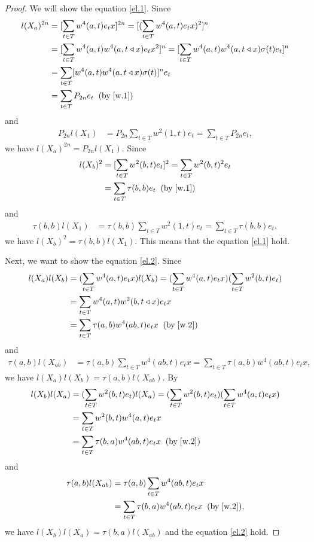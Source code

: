 \documentclass[a4paper,11pt]{amsart}
\numberwithin{equation}{section}
\begin{document}
\begin{proof}
We will show the equation \eqref{el.1}. Since
\begin{align*}
l(X_a)^{2n}&=[\sum\limits_{t \in T}w^4(a,t)e_t x]^{2n}=[(\sum\limits_{t \in T}w^4(a,t)e_t x)^2]^{n}\\
&=[\sum\limits_{t \in T}w^4(a,t)w^4(a,t\triangleleft x)e_t x^2]^{n}=[\sum\limits_{t \in T}w^4(a,t)w^4(a,t\triangleleft x)\sigma(t)e_t]^{n}\\
&=\sum\limits_{t \in T}[w^4(a,t)w^4(a,t\triangleleft x)\sigma(t)]^n e_t\\
&=\sum\limits_{t \in T} P_{2n}e_t\;\;(\text{by}\;\eqref{w.1})
\end{align*}
and
\begin{align*}
P_{2n}l(X_1)&=P_{2n}\sum\limits_{t \in T}w^2(1,t)e_t=\sum\limits_{t \in T}P_{2n}e_t,
\end{align*}
we have $l(X_a)^{2n}=P_{2n}l(X_1)$. Since
\begin{align*}
l(X_b)^{2}&=[\sum\limits_{t \in T}w^2(b,t)e_t]^{2}=\sum\limits_{t \in T}w^2(b,t)^2e_t\\
&=\sum\limits_{t \in T}\tau(b,b)e_t \;\;(\text{by}\;\eqref{w.1})
\end{align*}
and
\begin{align*}
\tau(b,b)l(X_1)&=\tau(b,b)\sum\limits_{t \in T}w^2(1,t)e_t=\sum\limits_{t \in T}\tau(b,b)e_t,
\end{align*}
 we have $l(X_b)^{2}=\tau(b,b)l(X_1)$. This means that the equation \eqref{el.1} hold.

Next, we want to show the equation \eqref{el.2}. Since
\begin{align*}
l(X_a)l(X_b)&=(\sum\limits_{t \in T}w^4(a,t)e_t x)l(X_b)=(\sum\limits_{t \in T}w^4(a,t)e_t x) (\sum\limits_{t \in T}w^2(b,t)e_t)\\
&=\sum\limits_{t \in T}w^4(a,t) w^2(b,t\triangleleft x)e_t x\\
&=\sum\limits_{t \in T}\tau(a,b) w^4(ab,t)e_t x \;\;(\text{by}\;\eqref{w.2})
\end{align*}
and
\begin{align*}
\tau(a,b)l(X_{ab})&=\tau(a,b) \sum\limits_{t \in T}w^4(ab,t)e_t x=\sum\limits_{t \in T}\tau(a,b)w^4(ab,t)e_t x,
\end{align*}
we have $l(X_a)l(X_b)=\tau(a,b)l(X_{ab})$. By
\begin{align*}
l(X_b)l(X_a)&=(\sum\limits_{t \in T}w^2(b,t)e_t)l(X_a)=(\sum\limits_{t \in T}w^2(b,t)e_t)(\sum\limits_{t \in T}w^4(a,t)e_t x)\\
&=\sum\limits_{t \in T}w^2(b,t) w^4(a,t)e_t x\\
&=\sum\limits_{t \in T}\tau(b,a) w^4(ab,t)e_t x  \;\;(\text{by}\;\eqref{w.2})
\end{align*}
and
\begin{align*}
\tau(a,b)l(X_{ab})&=\tau(a,b) \sum\limits_{t \in T}w^4(ab,t)e_t x\\&=\sum\limits_{t \in T}\tau(b,a) w^4(ab,t)e_t x \;\;(\text{by}\;\eqref{w.2}),
\end{align*}
 we have $l(X_b)l(X_a)=\tau(b,a)l(X_{ab})$ and the equation \eqref{el.2} hold.


\end{proof}
\end{document}

